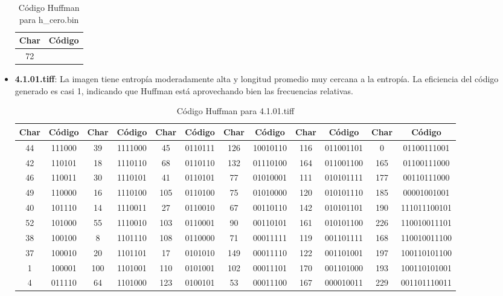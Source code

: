 \documentclass[conference,onecolumn,12pt]{IEEEtran}
\numberwithin{equation}{subsection}
\begin{document}
\begin{itemize}
\begin{table}[H]
\centering
\caption{Código Huffman para h\_cero.bin}
\label{tab:huffman_cerobin}
\begin{tabular}{cc}
\toprule
\textbf{Char} & \textbf{Código} \\
\midrule
72   &  \\     
\bottomrule
\end{tabular}
\end{table}
    
    \item \textbf{4.1.01.tiff}: La imagen tiene entropía moderadamente alta y longitud promedio muy cercana a la entropía. La eficiencia del código generado es casi 1, indicando que Huffman está aprovechando bien las frecuencias relativas.
    
    \begin{table}[H]
\centering
\caption{Código Huffman para 4.1.01.tiff}
\label{tab:huffman_4.1.01.tiff}
\begin{tabular}{cccccccccccc}
\toprule
\textbf{Char} & \textbf{Código} & \textbf{Char} & \textbf{Código} & \textbf{Char} & \textbf{Código} & \textbf{Char} & \textbf{Código} & \textbf{Char} & \textbf{Código} & \textbf{Char} & \textbf{Código} \\
\midrule
44 & 111000 & 39 & 1111000 & 45 & 0110111 & 126 & 10010110 & 116 & 011001101 & 0 & 01100111001 \\
42 & 110101 & 18 & 1110110 & 68 & 0110110 & 132 & 01110100 & 164 & 011001100 & 165 & 01100111000 \\
46 & 110011 & 30 & 1110101 & 41 & 0110101 & 77 & 01010001 & 111 & 010101111 & 177 & 00110111000 \\
49 & 110000 & 16 & 1110100 & 105 & 0110100 & 75 & 01010000 & 120 & 010101110 & 185 & 00001001001 \\
40 & 101110 & 14 & 1110011 & 27 & 0110010 & 67 & 00110110 & 142 & 010101101 & 190 & 111011100101 \\
52 & 101000 & 55 & 1110010 & 103 & 0110001 & 90 & 00110101 & 161 & 010101100 & 226 & 110010011101 \\
38 & 100100 & 8 & 1101110 & 108 & 0110000 & 71 & 00011111 & 119 & 001101111 & 168 & 110010011100 \\
37 & 100010 & 20 & 1101101 & 17 & 0101010 & 149 & 00011110 & 122 & 001101001 & 197 & 100110101100 \\
1 & 100001 & 100 & 1101001 & 110 & 0101001 & 102 & 00011101 & 170 & 001101000 & 193 & 100110101001 \\
4 & 011110 & 64 & 1101000 & 123 & 0100101 & 53 & 00011100 & 167 & 000010011 & 229 & 001101110011 \\

\end{tabular}
\end{table}
\end{itemize}
\end{document}
